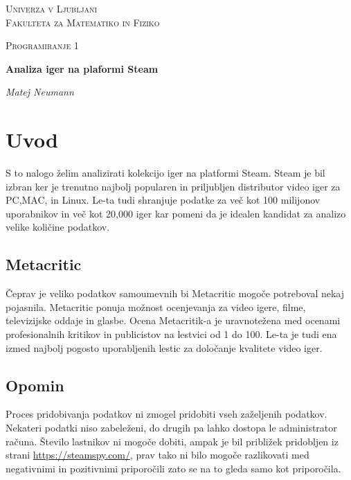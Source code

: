 \documentclass[a4paper]{article}
\begin{document}
\begin{titlepage}
	\centering

	{\scshape\LARGE Univerza v Ljubljani \\Fakulteta za Matematiko in Fiziko \par}
	\vspace{1cm}
	{\scshape\Large Programiranje 1\par}
	\vspace{1.5cm}
	{\huge\bfseries Analiza iger na plaformi Steam \par}
	\vspace{2cm}
	{\Large\itshape Matej Neumann\par}
	\vfill

	{\large \par}
\end{titlepage}

\section{Uvod}

S to nalogo želim analizirati kolekcijo iger na platformi Steam.
Steam je bil izbran ker je trenutno najbolj popularen in priljubljen distributor video iger za PC,MAC, in Linux.
Le-ta tudi shranjuje podatke za več kot 100 milijonov uporabnikov in več kot 20,000 iger kar pomeni da je idealen kandidat za analizo velike količine podatkov.


\subsection{Metacritic}

Čeprav je veliko podatkov samoumevnih bi Metacritic mogoče potreboval nekaj pojasnila.
Metacritic ponuja možnost ocenjevanja za video igere, filme, televizijske oddaje in glasbe.
Ocena Metacritik-a je uravnotežena med ocenami profesionalnih kritikov in publicistov na lestvici od 1 do 100.
Le-ta je tudi ena izmed najbolj pogosto uporabljenih lestic za določanje kvalitete video iger.

\subsection{Opomin}

Proces pridobivanja podatkov ni zmogel pridobiti vseh zaželjenih podatkov.
Nekateri podatki niso zabeleženi, do drugih pa lahko dostopa le administrator računa.
Število lastnikov ni mogoče dobiti, ampak je bil približek pridobljen iz strani \url{https://steamspy.com/}, prav tako ni bilo mogoče razlikovati med negativnimi in pozitivnimi priporočili zato se na to gleda samo kot priporočila.
\end{document}
